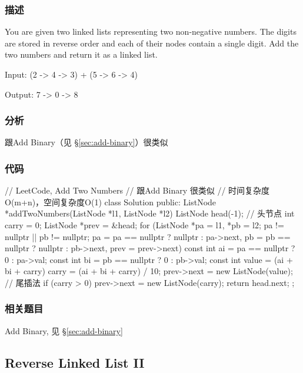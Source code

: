 \subsubsection{描述}
You are given two linked lists representing two non-negative numbers. The digits are stored in reverse order and each of their nodes contain a single digit. Add the two numbers and return it as a linked list.

Input: {\small {} (2 -> 4 -> 3) + (5 -> 6 -> 4)}

Output: {\small {} 7 -> 0 -> 8}


\subsubsection{分析}
跟Add Binary（见 \S \ref{sec:add-binary}）很类似


\subsubsection{代码}
\begin{Code}
// LeetCode, Add Two Numbers
// 跟Add Binary 很类似
// 时间复杂度O(m+n)，空间复杂度O(1)
class Solution {
public:
    ListNode *addTwoNumbers(ListNode *l1, ListNode *l2) {
        ListNode head(-1); // 头节点
        int carry = 0;
        ListNode *prev = &head;
        for (ListNode *pa = l1, *pb = l2;
             pa != nullptr || pb != nullptr;
             pa = pa == nullptr ? nullptr : pa->next,
             pb = pb == nullptr ? nullptr : pb->next,
             prev = prev->next) {
            const int ai = pa == nullptr ? 0 : pa->val;
            const int bi = pb == nullptr ? 0 : pb->val;
            const int value = (ai + bi + carry) %
            carry = (ai + bi + carry) / 10;
            prev->next = new ListNode(value); // 尾插法
        }
        if (carry > 0)
            prev->next = new ListNode(carry);
        return head.next;
    }
};
\end{Code}


\subsubsection{相关题目}

\begindot
\item Add Binary, 见 \S \ref{sec:add-binary}
\myenddot


\subsection{Reverse Linked List II}
\label{sec:reverse-linked-list-ii}


